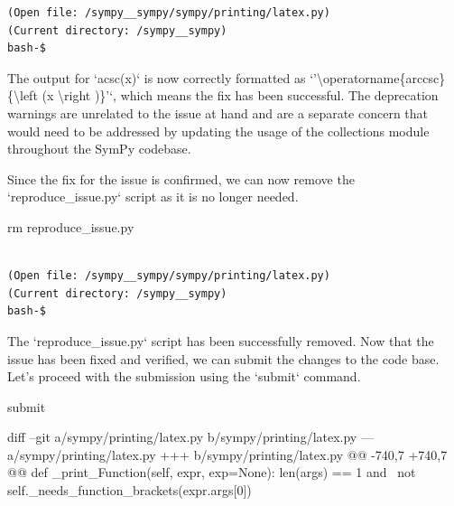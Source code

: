 {\begin{observationbox}
\begin{Verbatim}[breaklines=true, breakanywhere=true]
(Open file: /sympy__sympy/sympy/printing/latex.py)
(Current directory: /sympy__sympy)
bash-$
\end{Verbatim}
\end{observationbox}
\begin{agentbox}
The output for `acsc(x)` is now correctly formatted as `'{\textbackslash}operatorname\{arccsc\}\{{\textbackslash}left (x {\textbackslash}right )\}'`, which means the fix has been successful. The deprecation warnings are unrelated to the issue at hand and are a separate concern that would need to be addressed by updating the usage of the collections module throughout the SymPy codebase.



Since the fix for the issue is confirmed, we can now remove the `reproduce\_issue.py` script as it is no longer needed.



\hrulefill
\begin{CodeVerbatim}[breaklines=true, breakanywhere=true]
rm reproduce_issue.py
\end{CodeVerbatim}
\end{agentbox}
\begin{observationbox}\begin{Verbatim}[breaklines=true, breakanywhere=true]

(Open file: /sympy__sympy/sympy/printing/latex.py)
(Current directory: /sympy__sympy)
bash-$
\end{Verbatim}
\end{observationbox}
\begin{agentbox}
The `reproduce\_issue.py` script has been successfully removed. Now that the issue has been fixed and verified, we can submit the changes to the code base. Let's proceed with the submission using the `submit` command.



\hrulefill
\begin{CodeVerbatim}[breaklines=true, breakanywhere=true]
submit
\end{CodeVerbatim}
\end{agentbox}
\begin{observationbox}\begin{CodeVerbatim}[breaklines=true, breakanywhere=true]

diff --git a/sympy/printing/latex.py b/sympy/printing/latex.py
--- a/sympy/printing/latex.py
+++ b/sympy/printing/latex.py
@@ -740,7 +740,7 @@ def _print_Function(self, expr, exp=None):
                 len(args) == 1 and \
                 not self._needs_function_brackets(expr.args[0])
 

\end{CodeVerbatim}
\end{observationbox}}
